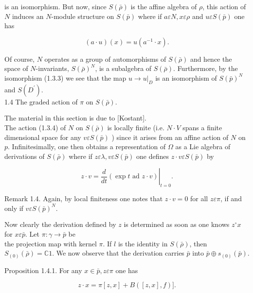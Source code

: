 \documentclass[10pt]{article}
\begin{document}
is an isomorphism. But now, since $S(\bar{\rho})$ is the affine algebra of $\rho$, this action of $N$ induces an $N$-module structure on $S(\bar{p})$ where if $a \varepsilon N, x \varepsilon \rho$ and $u \varepsilon S(\bar{p})$ one has


\begin{equation*}
(a \cdot u)(x)=u\left(a^{-1} \cdot x\right) . \tag{1.3.4}
\end{equation*}


Of course, $N$ operates as a group of automorphisms of $S(\bar{\rho})$ and hence the space of $N$-invariants, $S(\bar{\rho})^{N}$, is a subalgebra of $S(\bar{\rho})$. Furthermore, by the isomorphism (1.3.3) we see that the map $\left.u \rightarrow u\right|_{D}$ is an isomorphism of $S(\bar{p})^{N}$ and $S\left(D^{\prime}\right)$.\\
1.4 The graded action of $\pi$ on $S(\bar{\rho})$.

The material in this section is due to [Kostant].\\
The action (1.3.4) of $N$ on $S(\bar{\rho})$ is locally finite (i.e. $N \cdot V$ spans a finite dimensional space for any $v \varepsilon S(\bar{p})$ ) since it arises from an affine action of $N$ on $p$. Infinitesimally, one then obtains a representation of $\Omega$ as a Lie algebra of derivations of $S(\bar{\rho})$ where if $z \varepsilon \lambda, v \varepsilon S(\bar{p})$ one defines $z \cdot v \varepsilon S(\bar{p})$ by


\begin{equation*}
z \cdot v=\left.\frac{d}{d t}(\exp t \text { ad } z \cdot v)\right|_{t=0} . \tag{1.4.1}
\end{equation*}


Remark 1.4. Again, by local finiteness one notes that $z \cdot v=0$ for all $z \varepsilon \pi$, if and only if $v \varepsilon S(\bar{p})^{N}$.

Now clearly the derivation defined by $z$ is determined as soon as one knows $z^{\circ} x$ for $x \varepsilon \bar{p}$. Let $\pi: \mathcal{\gamma} \rightarrow \bar{p}$ be\\
the projection map with kernel $\pi$. If $l$ is the identity in $S(\bar{\rho})$, then $S_{(0)}(\bar{\rho})=\mathbb{C} 1$. We now observe that the derivation carries $\bar{p}$ into $\bar{p} \oplus s_{(0)}(\bar{p})$.

Proposition 1.4.1. For any $x \in \bar{p}, z \varepsilon \pi$ one has


\begin{equation*}
z \cdot x=\pi[z, x]+B([z, x], f)] . \tag{1.4.2}
\end{equation*}
\end{document}
